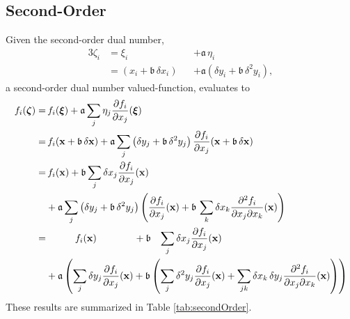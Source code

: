 \subsection{Second-Order}

Given the second-order dual number,
%
\begin{alignat*}{3}
\zeta_{i} 
&=
\xi_{i} 
&&+ \mathfrak{a} \, \eta_{i}
\\
&=
\left( x_{i} + \mathfrak{b} \, \delta x_{i} \right)
&&+ \mathfrak{a} \left( \delta y_{i} + \mathfrak{b} \, \delta^{2} y_{i} \right),
\end{alignat*}
%
a second-order dual number valued-function, evaluates to
%
\begin{align*}
f_{i} \! \left(  \mbox{\boldmath{$\zeta$}} \right)
=& \,
f_{i} \! \left(  \mbox{\boldmath{$\xi$}} \right) 
+ \mathfrak{a} \sum_{j} \eta_{j} \frac{ \partial f_{i} }{ \partial x_{j} } \! \left(  \mbox{\boldmath{$\xi$}} \right) 
\\
=& \,
f_{i} \! \left( \mathbf{x} + \mathfrak{b} \, \delta \mathbf{x} \right) 
+ \mathfrak{a} \sum_{j} \left( \delta y_{j} + \mathfrak{b} \, \delta^{2} y_{j} \right)
\frac{ \partial f_{i} }{ \partial x_{j} } 
\! \left( \mathbf{x} + \mathfrak{b} \, \delta \mathbf{x} \right) 
\\
=& \,
f_{i} \! \left( \mathbf{x} \right) 
+ \mathfrak{b} \sum_{j} \delta x_{j}  \frac{ \partial f_{i} }{ \partial x_{j} } \! \left( \mathbf{x} \right)
\\
&+ 
\mathfrak{a} \sum_{j} \left( \delta y_{j} + \mathfrak{b} \, \delta^{2} y_{j} \right)
\left( \frac{ \partial f_{i} }{ \partial x_{j} } \! \left( \mathbf{x}\right) + 
\mathfrak{b} \, \sum_{k} \delta x_{k} 
\frac{ \partial^{2} f_{i} }{ \partial x_{j} \partial x_{k} } \! \left( \mathbf{x} \right) \right) 
\\
=&
\quad\quad\quad 
f_{i} \! \left( \mathbf{x} \right) 
\quad\quad\quad\;\;\;
+ \mathfrak{b} \;\;\;
\sum_{j} \delta x_{j}  \frac{ \partial f_{i} }{ \partial x_{j} } \! \left( \mathbf{x} \right)
\\
&+ 
\mathfrak{a} \left( 
\sum_{j} \delta y_{j} \frac{ \partial f_{i} }{ \partial x_{j} } \! \left( \mathbf{x} \right) 
+ \mathfrak{b} \left(
\sum_{j} \delta^{2} y_{j} \frac{ \partial f_{i} }{ \partial x_{j} } \! \left( \mathbf{x} \right)
+ \sum_{jk} \delta x_{k} \, \delta y_{j}
\frac{ \partial^{2} f_{i} }{ \partial x_{j} \partial x_{k} } \! \left( \mathbf{x} \right)
\right)
\right)
\end{align*}
%
These results are summarized in Table \ref{tab:secondOrder}.

